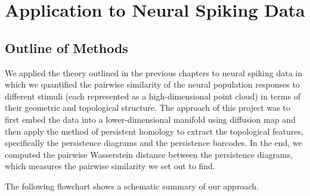 \chapter{Application to Neural Spiking Data} 
\label{chapter5-application}

\section{Outline of Methods}
We applied the theory outlined in the previous chapters to neural spiking data in which we quantified the pairwise similarity of the neural population responses to different stimuli (each represented as a high-dimensional point cloud) in terms of their geometric and topological structure. The approach of this project was to first embed the data into a lower-dimensional manifold using diffusion map and then apply the method of persistent homology to extract the topological features, specifically the persistence diagrams and the persistence barcodes. In the end, we computed the pairwise Wasserstein distance between the persistence diagrams, which measures the pairwise similarity we set out to find. 

The following flowchart shows a schematic summary of our approach.


